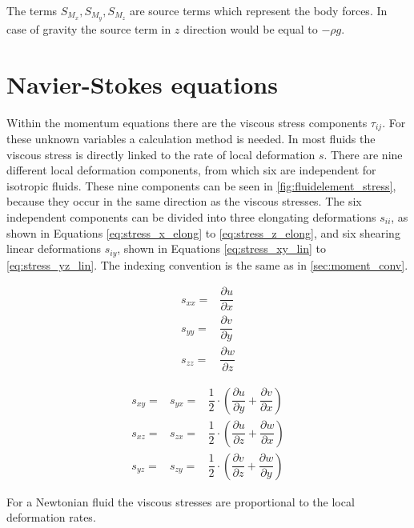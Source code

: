 \documentclass[../thesis.tex]{subfiles}
\begin{document}
The terms $S_{M_x}, S_{M_y}, S_{M_z}$ are source terms which represent the body forces. In case of gravity the source term in $z$ direction would be equal to $ -\rho g$.

\section{Navier-Stokes equations}

Within the momentum equations there are the viscous stress components $ \tau_{ij}$. For these unknown variables a calculation method is needed. In most fluids the viscous stress is directly linked to the rate of local deformation $ s $. There are nine different local deformation components, from which six are independent for isotropic fluids. These nine components can be seen in \autoref{fig:fluidelement_stress}, because they occur in the same direction as the viscous stresses. The six independent components can be divided into three elongating deformations $ s_{ii} $, as shown in Equations \ref{eq:stress_x_elong} to \ref{eq:stress_z_elong}, and six shearing linear deformations $ s_{iy} $, shown in Equations \ref{eq:stress_xy_lin} to \ref{eq:stress_yz_lin}. The indexing convention is the same as in \autoref{sec:moment_conv}.

\begin{eqnarray}
	s_{xx} = & \dfrac{\partial u}{\partial x} \label{eq:stress_x_elong} \\[6pt]
	s_{yy} = & \dfrac{\partial v}{\partial y} \label{eq:stress_y_elong}  \\[6pt] 
	s_{zz} = & \dfrac{\partial w}{\partial z} \label{eq:stress_z_elong}
\end{eqnarray}

\begin{eqnarray}
	s_{xy} = & s_{yx} = & \dfrac{1}{2} \cdot \left( \dfrac{\partial u}{\partial y} + \dfrac{\partial v}{\partial x} \right) \label{eq:stress_xy_lin} \\[6pt] 
	s_{xz} = & s_{zx} = & \dfrac{1}{2} \cdot \left( \dfrac{\partial u}{\partial z} + \dfrac{\partial w}{\partial x} \right) \label{eq:stress_xz_lin} \\[6pt] 
	s_{yz} = & s_{zy} = & \dfrac{1}{2} \cdot \left( \dfrac{\partial v}{\partial z} + \dfrac{\partial w}{\partial y} \right)	\label{eq:stress_yz_lin}
\end{eqnarray}

For a Newtonian fluid the viscous stresses are proportional to the local deformation rates.
\end{document}
